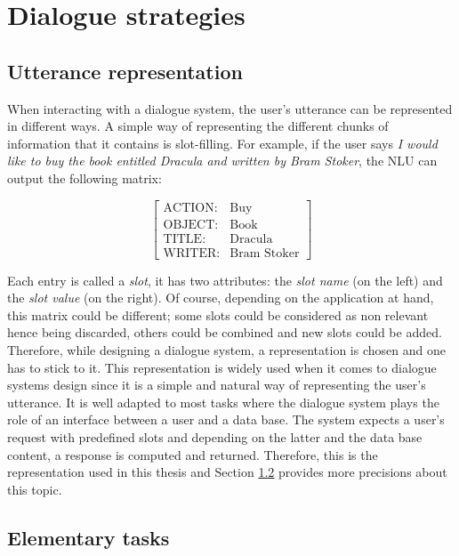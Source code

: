 \chapter{Dialogue strategies}
\label{ch:strategies}

\section{Utterance representation}
\label{sec:represent}
	
	When interacting with a dialogue system, the user's utterance can be represented in different ways. A simple way of representing the different chunks of information that it contains is slot-filling. For example, if the user says \textit{I would like to buy the book entitled Dracula and written by Bram Stoker}, the NLU can output the following matrix:
	
		$$
		\begin{bmatrix}
			\text{ACTION:} & \text{Buy} \\
			\text{OBJECT:} & \text{Book} \\
			\text{TITLE:} & \text{Dracula} \\
			\text{WRITER:} & \text{Bram Stoker}
		\end{bmatrix}
		$$
	
	Each entry is called a \textit{slot}, it has two attributes: the \textit{slot name} (on the left) and the \textit{slot value} (on the right). Of course, depending on the application at hand, this matrix could be different; some slots could be considered as non relevant hence being discarded, others could be combined and new slots could be added. Therefore, while designing a dialogue system, a representation is chosen and one has to stick to it. This representation is widely used when it comes to dialogue systems design since it is a simple and natural way of representing the user's utterance. It is well adapted to most tasks where the dialogue system plays the role of an interface between a user and a data base. The system expects a user's request with predefined slots and depending on the latter and the data base content, a response is computed and returned. Therefore, this is the representation used in this thesis and Section \ref{sec:elemtask} provides more precisions about this topic.

\section{Elementary tasks}
\label{sec:elemtask}

